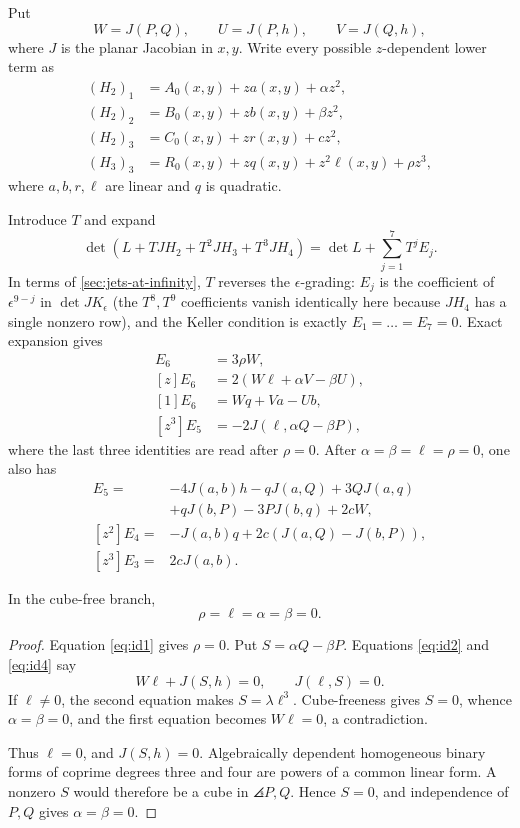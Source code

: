 \documentclass[11pt,reqno]{amsart}
\begin{document}
Put
\[
W=J(P,Q),\qquad U=J(P,h),\qquad V=J(Q,h),
\]
where \(J\) is the planar Jacobian in \(x,y\).  Write every possible
\(z\)-dependent lower term as
\begin{align}
(H_2)_1&=A_0(x,y)+za(x,y)+\alpha z^2,\nonumber\\
(H_2)_2&=B_0(x,y)+zb(x,y)+\beta z^2,\nonumber\\
(H_2)_3&=C_0(x,y)+zr(x,y)+cz^2,\label{eq:lower-terms}\\
(H_3)_3&=R_0(x,y)+zq(x,y)+z^2\ell(x,y)+\rho z^3,\nonumber
\end{align}
where \(a,b,r,\ell\) are linear and \(q\) is quadratic.

Introduce \(T\) and expand
\[
\det(L+T JH_2+T^2JH_3+T^3JH_4)
=\det L+\sum_{j=1}^7T^jE_j.
\]
In terms of \cref{sec:jets-at-infinity}, \(T\) reverses the
\(\epsilon\)-grading: \(E_j\) is the coefficient of
\(\epsilon^{9-j}\) in \(\det JK_\epsilon\) (the \(T^8,T^9\)
coefficients vanish identically here because \(JH_4\) has a single
nonzero row), and the Keller condition is exactly
\(E_1=\dots=E_7=0\).
Exact expansion gives
\begin{align}
[z^2]E_6&=3\rho W,\label{eq:id1}\\
[z]E_6&=2(W\ell+\alpha V-\beta U),\label{eq:id2}\\
[1]E_6&=Wq+Va-Ub,\label{eq:id3}\\
[z^3]E_5&=-2J(\ell,\alpha Q-\beta P),\label{eq:id4}
\end{align}
where the last three identities are read after \(\rho=0\).
After \(\alpha=\beta=\ell=\rho=0\), one also has
\begin{align}
[z]E_5={}&-4J(a,b)h-qJ(a,Q)+3QJ(a,q)\nonumber\\
&+qJ(b,P)-3PJ(b,q)+2cW,\label{eq:id5}\\
[z^2]E_4={}&-J(a,b)q+2c(J(a,Q)-J(b,P)),\label{eq:id6}\\
[z^3]E_3={}&2cJ(a,b).\label{eq:id7}
\end{align}

\begin{lemma}
\label{lem:first-syzygy}
In the cube-free branch,
\[
\rho=\ell=\alpha=\beta=0.
\]
\end{lemma}

\begin{proof}
Equation \eqref{eq:id1} gives \(\rho=0\).  Put
\(S=\alpha Q-\beta P\).  Equations \eqref{eq:id2} and
\eqref{eq:id4} say
\[
W\ell+J(S,h)=0,\qquad J(\ell,S)=0.
\]
If \(\ell\ne0\), the second equation makes
\(S=\lambda\ell^3\).  Cube-freeness gives \(S=0\), whence
\(\alpha=\beta=0\), and the first equation becomes \(W\ell=0\), a
contradiction.

Thus \(\ell=0\), and \(J(S,h)=0\).  Algebraically dependent homogeneous
binary forms of coprime degrees three and four are powers of a common linear
form.  A nonzero \(S\) would therefore be a cube in
\(\angles{P,Q}\).  Hence \(S=0\), and independence of \(P,Q\) gives
\(\alpha=\beta=0\).
\end{proof}
\end{document}
